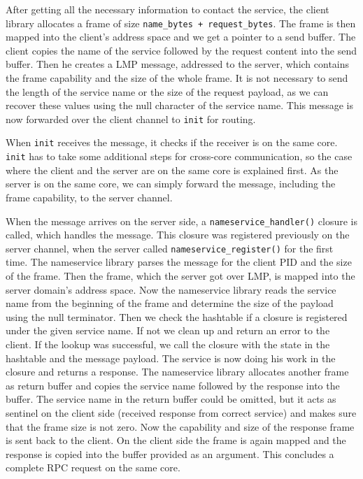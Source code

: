 After getting all the necessary information to contact the service, the client library allocates a frame of size 
\verb|name_bytes + request_bytes|. The frame is then mapped into the client's address space and we get a pointer to a send buffer. The client
copies the name of the service followed by the request content into the send buffer. Then he creates a LMP message, addressed to the server,
which contains the frame capability and the size of the whole frame. It is not necessary to send the length of the service name or the size
of the request payload, as we can recover these values using the null character of the service name. This message is now forwarded over the
client channel to \verb|init| for routing.

When \verb|init| receives the message, it checks if the receiver is on the same core. \verb|init| has to take some additional steps for 
cross-core communication, so the case where the client and the server are on the same core is explained first. As the server is on the same
core, we can simply forward the message, including the frame capability, to the server channel.

When the message arrives on the server side, a \verb|nameservice_handler()| closure is called, which handles the message. This closure was
registered previously on the server channel, when the server called \verb|nameservice_register()| for the first time. The nameservice library
parses the message for the client PID and the size of the frame. Then the frame, which the server got over LMP, is mapped into the server 
domain's address space. Now the nameservice library reads the service name from the beginning of the frame and determine the size of the 
payload using the null terminator. Then we check the hashtable if a closure is registered under the given service name. If not we clean up
and return an error to the client. If the lookup was successful, we call the closure with the state in the hashtable and the message payload.
The service is now doing his work in the closure and returns a response. The nameservice library allocates another frame as return buffer and
copies the service name followed by the response into the buffer. The service name in the return buffer could be omitted, but it acts as
sentinel on the client side (received response from correct service) and makes sure that the frame size is not zero. Now the capability and
size of the response frame is sent back to the client. On the client side the frame is again mapped and the response is copied into the buffer
provided as an argument. This concludes a complete RPC request on the same core.

